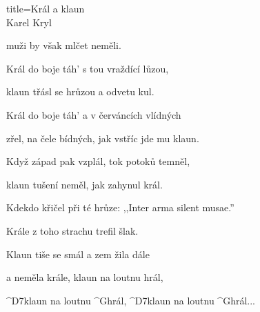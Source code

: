 \begin{song}{title=\centering Král a klaun \\\normalsize Karel Kryl  \vspace*{-0.3cm}}
{	muži by však mlčet neměli.

	Král do boje táh' s tou vraždící lůzou,

	klaun třásl se hrůzou a odvetu kul.

\sloka
	Král do boje táh' a v červáncích vlídných

	zřel, na čele bídných, jak vstříc jde mu klaun.

	Když západ pak vzplál, tok potoků temněl,

	klaun tušení neměl, jak zahynul král.

	Kdekdo křičel při té hrůze: ,,Inter arma silent musae.''

	Krále z toho strachu trefil šlak.

	Klaun tiše se smál a zem žila dále
	
	a neměla krále, klaun na loutnu hrál,

	^{D7}klaun na loutnu ^{G}hrál, ^{D7}klaun na loutnu ^{G}hrál\elipsa.\elipsa.\elipsa.



}
\setcounter{Slokočet}{0}
\end{song}
